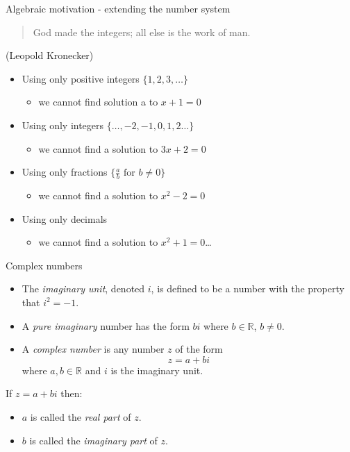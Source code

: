 \documentclass{beamer}
\begin{document}
\begin{frame}{Algebraic motivation - extending the number system}
\begin{quote}
God made the integers; all else is the work of man.
\end{quote}
(Leopold Kronecker)\vfill
\begin{itemize}
	\item Using only positive integers $\{1, 2, 3, \dots\}$
	\begin{itemize}
		\item we cannot find solution a to $x+1 = 0$
	\end{itemize}
	\item Using only integers $\{\dots, -2, -1, 0, 1, 2 \dots\}$
	\begin{itemize}
		\item we cannot find a solution to $3x+2 = 0$
	\end{itemize}
	\item Using only fractions $\{\frac{a}{b} \text{ for } b\neq0 \}$
	\begin{itemize}
		\item we cannot find a solution to $x^2-2 =0$
	\end{itemize}
	\item Using only decimals
	\begin{itemize}
		\item we cannot find a solution to $x^2 + 1 = 0$\dots
	\end{itemize}
\end{itemize}
\end{frame}

\begin{frame}{Complex numbers}
\begin{definition}
\begin{itemize}
\item
The \emph{imaginary unit}, denoted $i$, is defined to be
a number with the property that $i^2=-1$.
\item
A \emph{pure imaginary} number has the form $bi$ where 
$b\in \mathbb{R}$, $b\neq 0$.
\item
A \emph{complex number} is any number $z$ of the form
\[ z = a + bi\]
where $a,b\in \mathbb{R}$ and $i$ is the imaginary unit.
\end{itemize}
\end{definition}
\begin{definition}
If $z = a + bi$ then:
\begin{itemize}
\item
$a$ is called the \emph{real part} of $z$.
\item
$b$ is called the \emph{imaginary part} of $z$.
\end{itemize}
\end{definition}
\end{frame}
\end{document}

